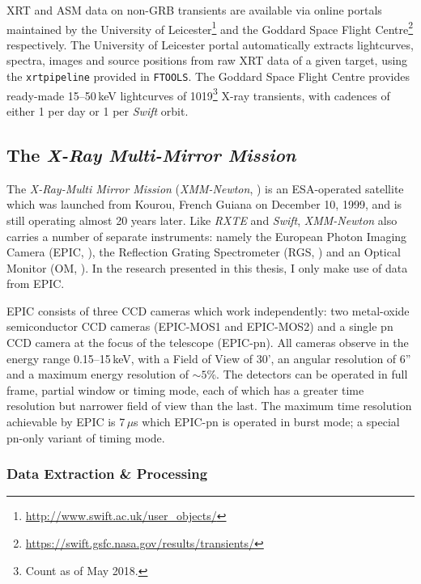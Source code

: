 \par XRT and ASM data on non-GRB transients are available via online portals maintained by the University of Leicester\footnote{\url{http://www.swift.ac.uk/user_objects/}} and the Goddard Space Flight Centre\footnote{\url{https://swift.gsfc.nasa.gov/results/transients/}} respectively.  The University of Leicester portal automatically extracts lightcurves, spectra, images and source positions from raw XRT data of a given target, using the \texttt{xrtpipeline} provided in \texttt{FTOOLS}.  The Goddard Space Flight Centre provides ready-made 15--50\,keV lightcurves of 1019\footnote{Count as of May 2018.} X-ray transients, with cadences of either 1 per day or 1 per \textit{Swift} orbit.

\subsection{The \textit{X-Ray Multi-Mirror Mission}}

\par The \textit{X-Ray-Multi Mirror Mission} (\textit{XMM-Newton}, \citealp{Jansen_XMM}) is an ESA-operated satellite which was launched from Kourou, French Guiana on December 10, 1999, and is still operating almost 20 years later.  Like \textit{RXTE} and \textit{Swift}, \textit{XMM-Newton} also carries a number of separate instruments: namely the European Photon Imaging Camera (EPIC, \citealp{Bignami_EPIC}), the Reflection Grating Spectrometer (RGS, \citealp{denHerder_RGS}) and an Optical Monitor (OM, \citealp{Mason_OM}).  In the research presented in this thesis, I only make use of data from EPIC.
\par EPIC consists of three CCD cameras which work independently: two metal-oxide semiconductor CCD cameras (EPIC-MOS1 and EPIC-MOS2) and a single pn CCD camera at the focus of the telescope (EPIC-pn).  All cameras observe in the energy range 0.15--15\,keV, with a Field of View of 30', an angular resolution of 6'' and a maximum energy resolution of $\sim5$\%.  The detectors can be operated in full frame, partial window or timing mode, each of which has a greater time resolution but narrower field of view than the last.  The maximum time resolution achievable by EPIC is 7\,$\mu$s which EPIC-pn is operated in burst mode; a special pn-only variant of timing mode.

\subsubsection{Data Extraction \& Processing}

